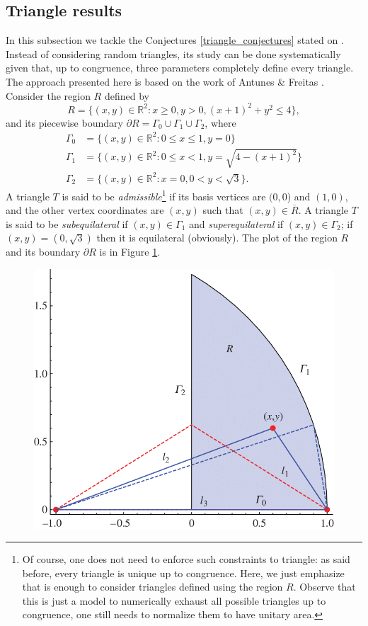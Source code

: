 \subsection{Triangle results}

In this subsection we tackle the Conjectures \ref{triangle_conjectures} stated on \cite{vu2023spectral}. Instead of considering random triangles, its study can be done systematically given that, up to congruence, three parameters completely define every triangle. The approach presented here is based on the work of Antunes \& Freitas \cite{antunes2011inverse}. Consider the region \(R\) defined by
\[
    R = \{(x, y) \in \mathbb{R}^2: x \geq 0, y > 0, (x+1)^2 + y^2 \leq 4\},
\]
and its piecewise boundary \(\partial R = \Gamma_0 \cup \Gamma_1 \cup \Gamma_2\), where
\begin{align*}
    \Gamma_0 &= \{(x,y) \in \mathbb{R}^2: 0 \leq x \leq 1, y=0\}\\
    \Gamma_1 &= \{(x,y) \in \mathbb{R}^2: 0 \leq x < 1, y=\sqrt{4-(x+1)^2}\}\\
    \Gamma_2 &= \{(x,y) \in \mathbb{R}^2: x=0, 0 < y < \sqrt{3}\}.
\end{align*}
A triangle \(T\) is said to be \textit{admissible}\footnote{Of course, one does not need to enforce such constraints to triangle: as said before, every triangle is unique up to congruence. Here, we just emphasize that is enough to consider triangles defined using the region \(R\). Observe that this is just a model to numerically exhaust all possible triangles up to congruence, one still needs to normalize them to have unitary area.} if its basis vertices are \((0, 0\)) and \((1, 0)\), and the other vertex coordinates are \((x,y)\) such that \((x,y) \in \overline{R}\). A triangle \(T\) is said to be \textit{subequilateral} if \((x, y) \in \Gamma_1\) and \textit{superequilateral} if \((x, y) \in \Gamma_2\); if \((x, y) = (0, \sqrt{3})\) then it is equilateral (obviously). The plot of the region \(R\) and its boundary \(\partial R\) is in Figure \ref{dirac_triangle_model}.
\begin{figure}[!htb]
    \centering
    \includegraphics[width=0.5\linewidth]{Images/Dirac/model_triangle.png}
    \label{dirac_triangle_model}
\end{figure}
